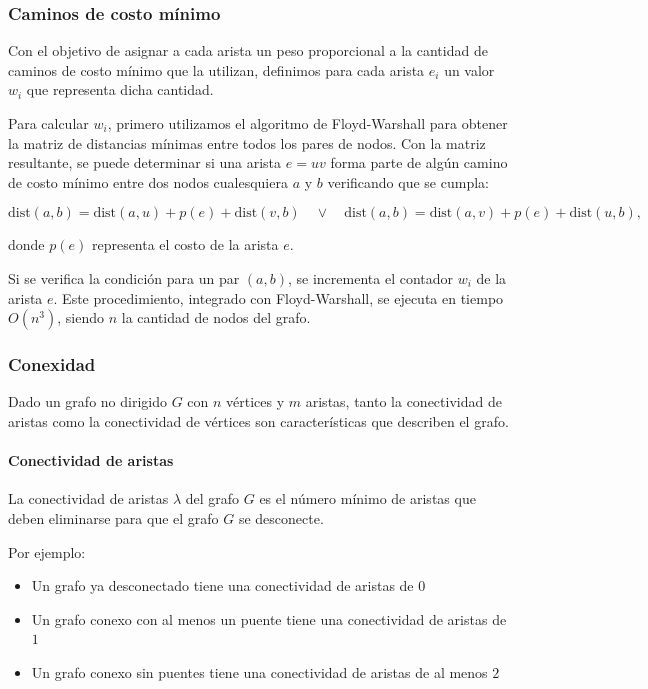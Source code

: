 \documentclass[a4paper]{article}
\begin{document}
\subsubsection{Caminos de costo mínimo}

Con el objetivo de asignar a cada arista un peso proporcional a la cantidad de caminos de costo mínimo que la utilizan, definimos para cada arista \(e_i\) un valor \(w_i\) que representa dicha cantidad.

Para calcular \(w_i\), primero utilizamos el algoritmo de Floyd-Warshall para obtener la matriz de distancias mínimas entre todos los pares de nodos. Con la matriz resultante, se puede determinar si una arista \(e = uv\) forma parte de algún camino de costo mínimo entre dos nodos cualesquiera \(a\) y \(b\) verificando que se cumpla:

\[
\text{dist}(a, b) = \text{dist}(a, u) + p(e) + \text{dist}(v, b) \quad \lor \quad \text{dist}(a, b) = \text{dist}(a, v) + p(e) + \text{dist}(u, b),
\]

donde \(p(e)\) representa el costo de la arista \(e\).

Si se verifica la condición para un par \((a, b)\), se incrementa el contador \(w_i\) de la arista \(e\). Este procedimiento, integrado con Floyd-Warshall, se ejecuta en tiempo \(O(n^3)\), siendo \(n\) la cantidad de nodos del grafo.


\subsubsection{Conexidad}

Dado un grafo no dirigido \(G\) con \(n\) vértices y \(m\) aristas, tanto la conectividad de aristas como la conectividad de vértices son características que describen el grafo.

\paragraph{Conectividad de aristas}
La conectividad de aristas \(\lambda\) del grafo \(G\) es el número mínimo de aristas que deben eliminarse para que el grafo \(G\) se desconecte.

Por ejemplo:
\begin{itemize}
    \item Un grafo ya desconectado tiene una conectividad de aristas de \(0\)
    \item Un grafo conexo con al menos un puente tiene una conectividad de aristas de \(1\)
    \item Un grafo conexo sin puentes tiene una conectividad de aristas de al menos \(2\)
\end{itemize}
\end{document}
